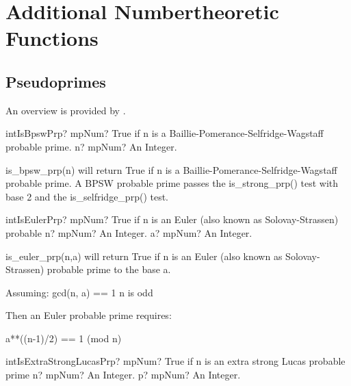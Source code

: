 \section{Additional Numbertheoretic Functions}
\label{AdditionalNumbertheoreticFunctions}

\subsection{Pseudoprimes}

An overview is provided by \cite{Grantham_2001}.

\vspace{0.6cm}
\begin{mpFunctionsExtract}
	\mpFunctionOne
	{intIsBpswPrp? mpNum? True if n is a Baillie-Pomerance-Selfridge-Wagstaff probable prime.}
	{n? mpNum? An Integer.}
\end{mpFunctionsExtract}

\vspace{0.3cm}

%
is\_bpsw\_prp(n) will return True if n is a Baillie-Pomerance-Selfridge-Wagstaff probable prime.
A BPSW probable prime passes the is\_strong\_prp() test with base 2 and the
is\_selfridge\_prp() test.


\vspace{0.6cm}
\begin{mpFunctionsExtract}
	\mpFunctionTwo
	{intIsEulerPrp? mpNum? True if n is an Euler (also known as Solovay-Strassen) probable}
	{n? mpNum? An Integer.}
	{a? mpNum? An Integer.}
\end{mpFunctionsExtract}

\vspace{0.3cm}

is\_euler\_prp(n,a) will return True if n is an Euler (also known as Solovay-Strassen) probable
prime to the base a.

Assuming:
gcd(n, a) == 1
n is odd

Then an Euler probable prime requires:

a**((n-1)/2) == 1 (mod n)


\vspace{0.6cm}
\begin{mpFunctionsExtract}
	\mpFunctionTwo
	{intIsExtraStrongLucasPrp? mpNum? True if n is an extra strong Lucas probable prime}
	{n? mpNum? An Integer.}
	{p? mpNum? An Integer.}
\end{mpFunctionsExtract}

\vspace{0.3cm}

